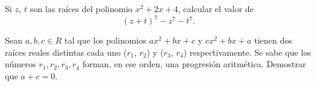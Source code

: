 \begin{multicols}{2}
    \begin{problem}
        Si $z$, $t$ son las raíces del polinomio $x^2 + 2x + 4$, calcular el valor de
        \[
            (z + t)^7 - z^7 - t^7.
        \]
    \end{problem}

    \begin{problem}
        Sean $a, b, c \in R$ tal que los polinomios $ax^2 + bx + c$ y $cx^2 + bx + a$
        tienen dos raíces reales distintas cada uno ($r_1$, $r_2$) y ($r_3$, $r_4$) respectivamente.
        Se sabe que los números $r_1, r_2, r_3, r_4$ forman, en ese orden, una progresión aritmética.
        Demostrar que $a + c = 0.$
    \end{problem}
\end{multicols}